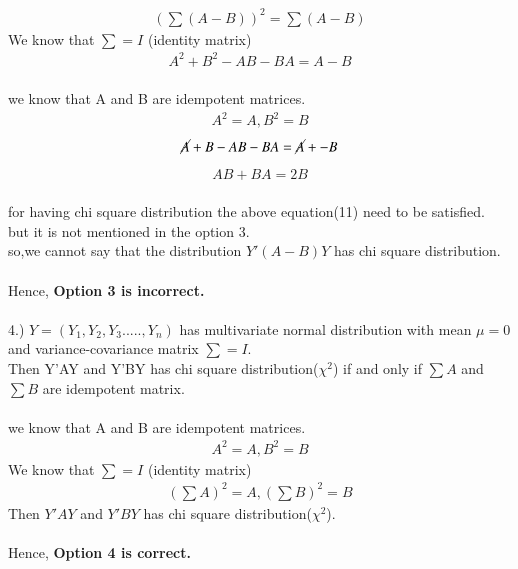\documentclass[journal,12pt,twocolumn]{IEEEtran}
\begin{document}
\begin{enumerate}
  \begin{align}
 (\textstyle \sum(A-B))^2=\sum(A-B) 
  \end{align}
   We know that $\sum=I$ (identity matrix)
    \begin{align}
 A^2+B^2-AB-BA=A-B 
  \end{align}
  \\we know that A and B are idempotent matrices.
    \begin{align}
 A^2=A ,B^2=B 
  \end{align}
   \begin{align}
 \cancel{A}+{B}-AB-BA=\cancel{A}+{-B}
  \end{align}
  \begin{align}
 AB+BA=2B
  \end{align}
  \\for having chi square distribution the above equation(11) need to be satisfied.\\
  but it is not mentioned in the option 3.\\
  so,we cannot say that the distribution $Y'(A-B)Y$ has chi square distribution.\\
   \\ Hence, \textbf{Option 3 is incorrect.}\\
 \\4.) $Y=(Y_1,Y_2,Y_3.....,Y_n)$ has multivariate normal distribution with mean $\mu=0$ and variance-covariance matrix $\sum=I$.\\
 Then Y'AY and Y'BY has chi square distribution($\chi^2$)  if and only if $\sum A$ and $\sum B$ are idempotent matrix.\\
 \\we know that A and B are idempotent matrices.
  \begin{align}
 A^2=A ,B^2=B  
  \end{align}
  We know that $\sum=I$ (identity matrix)
  \begin{align}
 (\textstyle \sum  A)^2=A ,(\textstyle \sum B)^2=B 
  \end{align}
 Then $Y'AY$ and $Y'BY$ has chi square distribution($\chi^2$).\\
\\Hence, \textbf{Option 4 is correct.}
 \end{enumerate}
\end{document}
